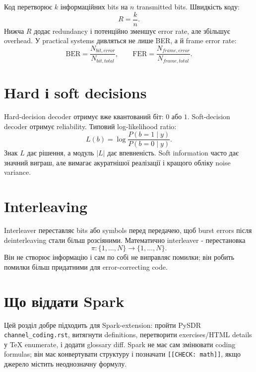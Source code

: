 Код перетворює $k$ інформаційних bits на $n$ transmitted bits. Швидкість коду:
\[
  R=\frac{k}{n}.
\]
Нижча $R$ додає redundancy і потенційно зменшує error rate, але збільшує overhead. У practical systems дивляться не лише BER, а й frame error rate:
\[
  \mathrm{BER}=\frac{N_{bit,error}}{N_{bit,total}},\qquad
  \mathrm{FER}=\frac{N_{frame,error}}{N_{frame,total}}.
\]

\section{Hard і soft decisions}

Hard-decision decoder отримує вже квантований біт: $0$ або $1$. Soft-decision decoder отримує reliability. Типовий log-likelihood ratio:
\[
  L(b)=\log\frac{P(b=1\mid y)}{P(b=0\mid y)}.
\]
Знак $L$ дає рішення, а модуль $|L|$ дає впевненість. Soft information часто дає значний виграш, але вимагає акуратнішої реалізації і кращого обліку noise variance.

\section{Interleaving}

Interleaver переставляє bits або symbols перед передачею, щоб burst errors після deinterleaving стали більш розсіяними. Математично interleaver - перестановка
\[
  \pi:\{1,\ldots,N\}\to\{1,\ldots,N\}.
\]
Він не створює інформацію і сам по собі не виправляє помилки; він робить помилки більш придатними для error-correcting code.

\section{Що віддати Spark}

Цей розділ добре підходить для Spark-extension: пройти PySDR \texttt{channel\_coding.rst}, витягнути definitions, перетворити exercises/HTML details у TeX enumerate, і додати glossary diff. Spark не має сам змінювати coding formulas; він має конвертувати структуру і позначати \texttt{[[CHECK: math]]}, якщо джерело містить неоднозначну формулу.
